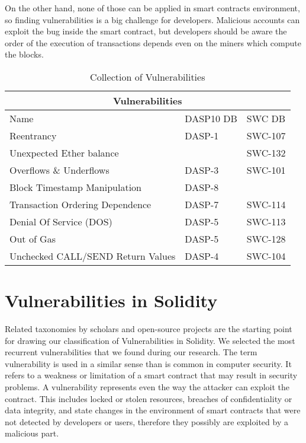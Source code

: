 \documentclass[a4paper,sigconf, language=french,
language=german, language=spanish, language=english]{acmart}
\begin{document}
On the other hand, none of those can be applied in smart contracts environment, so finding vulnerabilities is a big challenge for developers. 
Malicious accounts can exploit the bug inside the smart contract, but developers should be aware the order of the execution of transactions depends even on the miners which compute the blocks.


\begin{table*}
  \caption{Collection of Vulnerabilities}
  \label{tab:CollectionOfVulnerabilities}
  \begin{tabular}{ |p{5cm}|p{5cm}|p{5cm}| }
  \hline
  \multicolumn{3}{|c|}{Vulnerabilities} \\
  \hline
  Name  & DASP10 DB & SWC DB \\
  \hline
  Reentrancy  & DASP-1 & SWC-107 \\
  \hline
  Unexpected Ether balance  & & SWC-132  \\
  \hline
  Overflows \& Underflows  & DASP-3 & SWC-101 \\
  \hline
  Block Timestamp Manipulation  & DASP-8 & \\
  \hline
  Transaction Ordering Dependence  & DASP-7  & SWC-114 \\
  \hline
  Denial Of Service (DOS)  & DASP-5 &  SWC-113\\
  \hline
  Out of Gas  & DASP-5 & SWC-128 \\
  \hline
  Unchecked CALL/SEND Return Values  & DASP-4 & SWC-104\\
  \hline
  \end{tabular}
\end{table*}

\section{Vulnerabilities in Solidity}
\label{Vulnerabilities}
Related taxonomies by scholars and open-source projects are the starting point for drawing our classification of Vulnerabilities in Solidity. 
We selected the most recurrent vulnerabilities that we found during our research.
The term vulnerability is used in a similar sense than is common in computer security. 
It refers to a weakness or limitation of a smart contract that may result in
security problems. 
A vulnerability represents even the way the attacker can exploit the contract. 
This includes locked or stolen resources, breaches of confidentiality or data integrity, and state
changes in the environment of smart contracts that were not
detected by developers or users, therefore they possibly are exploited by a malicious part.
\end{document}
